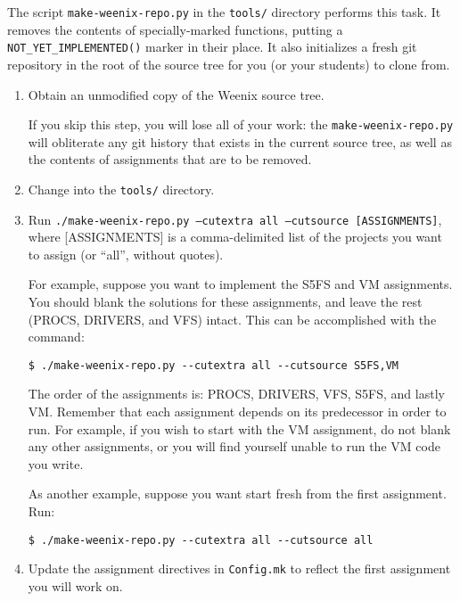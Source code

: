 The script \texttt{make-weenix-repo.py} in the \texttt{tools/} directory performs this task.  It removes the contents of specially-marked functions, putting a \texttt{NOT\_YET\_IMPLEMENTED()} marker in their place.  It also initializes a fresh git repository in the root of the source tree for you (or your students) to clone from.

\begin{enumerate}

\item Obtain an unmodified copy of the Weenix source tree.

If you skip this step, you will lose all of your work: the \texttt{make-weenix-repo.py} will obliterate any git history that exists in the current source tree, as well as the contents of assignments that are to be removed.

\item Change into the \texttt{tools/} directory.

\item Run \texttt{./make-weenix-repo.py --cutextra all --cutsource [ASSIGNMENTS]}, where [ASSIGNMENTS] is a comma-delimited list of the projects you want to assign (or ``all'', without quotes).

For example, suppose you want to implement the S5FS and VM assignments.  You should blank the solutions for these assignments, and leave the rest (PROCS, DRIVERS, and VFS) intact.  This can be accomplished with the command:

\begin{verbatim}
$ ./make-weenix-repo.py --cutextra all --cutsource S5FS,VM\end{verbatim}

The order of the assignments is: PROCS, DRIVERS, VFS, S5FS, and lastly VM.  Remember that each assignment depends on its predecessor in order to run.  For example, if you wish to start with the VM assignment, do not blank any other assignments, or you will find yourself unable to run the VM code you write.

As another example, suppose you want start fresh from the first assignment.  Run:

\begin{verbatim}
$ ./make-weenix-repo.py --cutextra all --cutsource all\end{verbatim}

\item Update the assignment directives in \texttt{Config.mk} to reflect the first assignment you will work on.


\end{enumerate}
